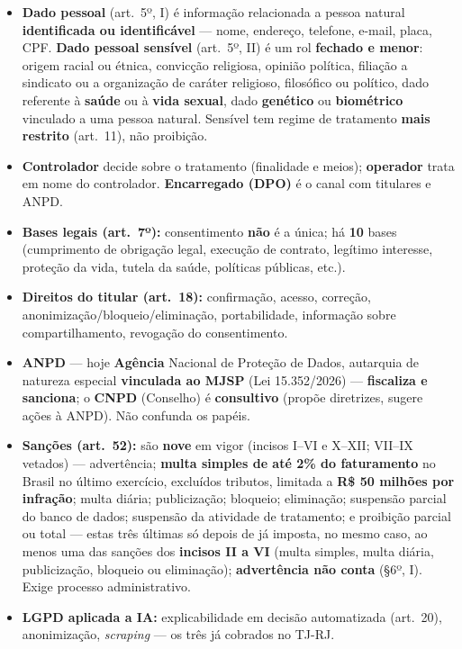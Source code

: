 \begin{itemize}
\item \textbf{Dado pessoal} (art.\ 5º, I) é informação relacionada a pessoa
natural \textbf{identificada ou identificável} --- nome, endereço, telefone,
e-mail, placa, CPF. \textbf{Dado pessoal sensível} (art.\ 5º, II) é um rol
\textbf{fechado e menor}: origem racial ou étnica, convicção religiosa,
opinião política, filiação a sindicato ou a organização de caráter religioso,
filosófico ou político, dado referente à \textbf{saúde} ou à \textbf{vida
sexual}, dado \textbf{genético} ou \textbf{biométrico} vinculado a uma pessoa
natural. Sensível tem regime de tratamento \textbf{mais restrito} (art.\ 11),
não proibição.
\item \textbf{Controlador} decide sobre o tratamento (finalidade e meios);
\textbf{operador} trata em nome do controlador. \textbf{Encarregado (DPO)} é
o canal com titulares e ANPD.
\item \textbf{Bases legais (art.\ 7º):} consentimento \textbf{não} é a
única; há \textbf{10} bases (cumprimento de obrigação legal, execução de
contrato, legítimo interesse, proteção da vida, tutela da saúde, políticas
públicas, etc.).
\item \textbf{Direitos do titular (art.\ 18):} confirmação, acesso,
correção, anonimização/bloqueio/eliminação, portabilidade, informação sobre
compartilhamento, revogação do consentimento.
\item \textbf{ANPD} --- hoje \textbf{Agência} Nacional de Proteção de Dados,
autarquia de natureza especial \textbf{vinculada ao MJSP} (Lei 15.352/2026)
--- \textbf{fiscaliza e sanciona}; o \textbf{CNPD} (Conselho) é
\textbf{consultivo} (propõe diretrizes, sugere ações à ANPD). Não confunda os
papéis.
\item \textbf{Sanções (art.\ 52):} são \textbf{nove} em vigor (incisos
I--VI e X--XII; VII--IX vetados) --- advertência; \textbf{multa simples de até
2\% do faturamento} no Brasil no último exercício, excluídos tributos,
limitada a \textbf{R\$ 50 milhões por infração}; multa diária; publicização;
bloqueio; eliminação; suspensão parcial do banco de dados; suspensão da
atividade de tratamento; e proibição parcial ou total --- estas três últimas
só depois de já imposta, no mesmo caso, ao menos uma das sanções dos
\textbf{incisos II a VI} (multa simples, multa diária, publicização, bloqueio
ou eliminação); \textbf{advertência não conta} (§6º, I). Exige processo
administrativo.
\item \textbf{LGPD aplicada a IA:} explicabilidade em decisão automatizada
(art.\ 20), anonimização, \emph{scraping} --- os três já cobrados no TJ-RJ.
\end{itemize}


